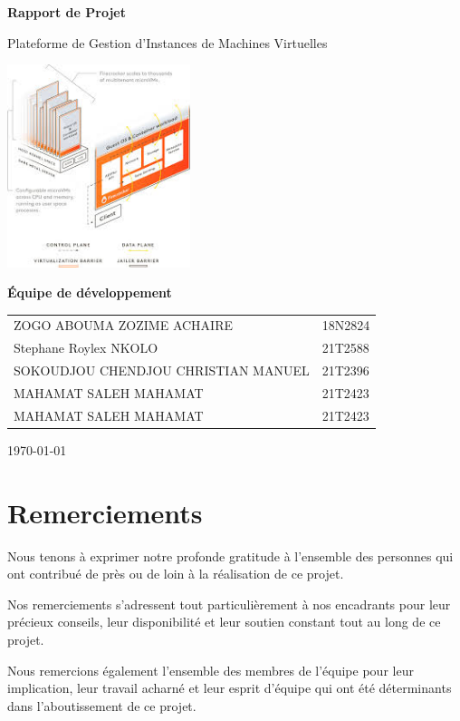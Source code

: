 \documentclass[12pt,a4paper]{report}
\begin{document}
\begin{titlepage}
    \centering
    \vspace*{2cm}
    {\Huge\bfseries Rapport de Projet\par}
    {\LARGE Plateforme de Gestion d'Instances de Machines Virtuelles\par}
    \vspace{3cm}
    \includegraphics[width=0.4\textwidth]{logo.png}\par
    \vspace{2cm}
    {\Large\bfseries Équipe de développement\par}
    \vspace{0.5cm}
    \begin{tabular}{ll}
        ZOGO ABOUMA ZOZIME ACHAIRE & 18N2824 \\
        Stephane Roylex NKOLO & 21T2588 \\
        SOKOUDJOU CHENDJOU CHRISTIAN MANUEL & 21T2396 \\
        MAHAMAT SALEH MAHAMAT & 21T2423 \\
        MAHAMAT SALEH MAHAMAT & 21T2423 \\
    \end{tabular}
    \vfill
    {\large \today\par}
\end{titlepage}

\tableofcontents
\newpage

\chapter*{Remerciements}
Nous tenons à exprimer notre profonde gratitude à l'ensemble des personnes qui ont contribué de près ou de loin à la réalisation de ce projet.\par
\vspace{0.5cm}
Nos remerciements s'adressent tout particulièrement à nos encadrants pour leur précieux conseils, leur disponibilité et leur soutien constant tout au long de ce projet.\par
\vspace{0.5cm}
Nous remercions également l'ensemble des membres de l'équipe pour leur implication, leur travail acharné et leur esprit d'équipe qui ont été déterminants dans l'aboutissement de ce projet.
\end{document}
